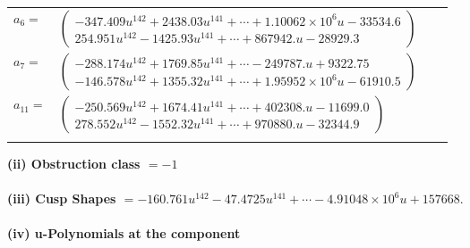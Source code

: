 \documentclass[1p]{elsarticle_modified}
\theoremstyle{definition}
\begin{document}
\begin{tabular}{m{7pt} m{180pt} m{7pt} m{180pt} }
\flushright $a_{6}=$&$\begin{pmatrix}-347.409 u^{142}+2438.03 u^{141}+\cdots+1.10062\times10^{6} u-33534.6\\254.951 u^{142}-1425.93 u^{141}+\cdots+867942. u-28929.3\end{pmatrix}$ \\
\flushright $a_{7}=$&$\begin{pmatrix}-288.174 u^{142}+1769.85 u^{141}+\cdots-249787. u+9322.75\\-146.578 u^{142}+1355.32 u^{141}+\cdots+1.95952\times10^{6} u-61910.5\end{pmatrix}$ \\
\flushright $a_{11}=$&$\begin{pmatrix}-250.569 u^{142}+1674.41 u^{141}+\cdots+402308. u-11699.0\\278.552 u^{142}-1552.32 u^{141}+\cdots+970880. u-32344.9\end{pmatrix}$\\&\end{tabular}
\flushleft \textbf{(ii) Obstruction class $= -1$}\\~\\
\flushleft \textbf{(iii) Cusp Shapes $= -160.761 u^{142}-47.4725 u^{141}+\cdots-4.91048\times10^{6} u+157668.$}\\~\\
\newpage\renewcommand{\arraystretch}{1}
\flushleft \textbf{(iv) u-Polynomials at the component}\newline \\
\end{document}
